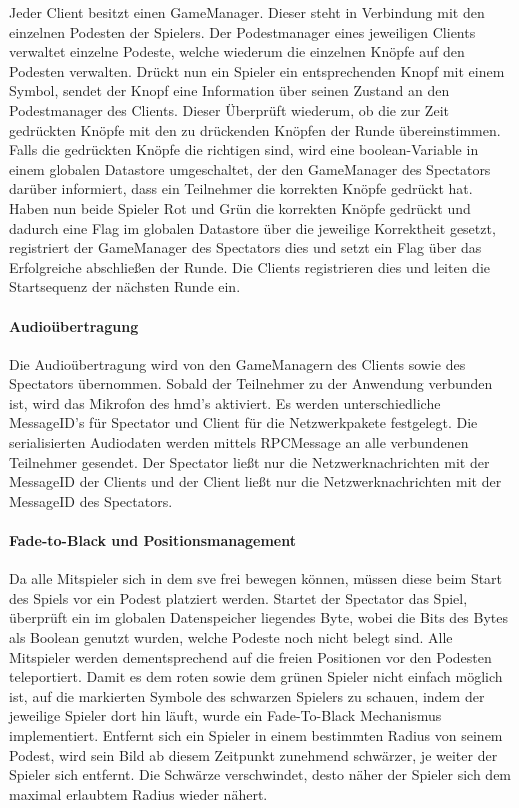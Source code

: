 \documentclass[a4paper,11pt]{article}%
\renewcommand{\\}{\vspace*{0.5\baselineskip} \newline}
\begin{document}
Jeder Client besitzt einen GameManager. Dieser steht in Verbindung mit den einzelnen Podesten der Spielers. Der Podestmanager eines jeweiligen Clients verwaltet einzelne Podeste, welche wiederum die einzelnen Knöpfe auf den Podesten verwalten. 
Drückt nun ein Spieler ein entsprechenden Knopf mit einem Symbol, sendet der Knopf eine Information über seinen Zustand an den Podestmanager des Clients. Dieser Überprüft wiederum, ob die zur Zeit gedrückten Knöpfe mit den zu drückenden Knöpfen der Runde übereinstimmen. Falls die gedrückten Knöpfe die richtigen sind, wird eine boolean-Variable in einem globalen Datastore umgeschaltet, der den GameManager des Spectators darüber informiert, dass ein Teilnehmer die korrekten Knöpfe gedrückt hat. Haben nun beide Spieler \dq{}Rot und Grün\dq{} die korrekten Knöpfe gedrückt und dadurch eine Flag im globalen Datastore über die jeweilige Korrektheit gesetzt, registriert der GameManager des Spectators dies und setzt ein Flag über das Erfolgreiche abschließen der Runde. Die Clients registrieren dies und leiten die Startsequenz der nächsten Runde ein. 

\paragraph{Audioübertragung}
Die Audioübertragung wird von den GameManagern des Clients sowie des Spectators übernommen. Sobald der Teilnehmer zu der Anwendung verbunden ist, wird das Mikrofon des \ac{hmd}'s aktiviert. Es werden unterschiedliche MessageID's für Spectator und Client für die Netzwerkpakete festgelegt. Die serialisierten Audiodaten werden mittels RPCMessage an alle verbundenen Teilnehmer gesendet. Der Spectator ließt nur die Netzwerknachrichten mit der MessageID der Clients und der Client ließt nur die Netzwerknachrichten mit der MessageID des Spectators.
\newpage
\paragraph{Fade-to-Black und Positionsmanagement}
	Da alle Mitspieler sich in dem \ac{sve} frei bewegen können, müssen diese beim Start des Spiels vor ein Podest platziert werden. Startet der Spectator das Spiel, überprüft ein im globalen Datenspeicher liegendes Byte, wobei die Bits des Bytes als Boolean genutzt wurden, welche Podeste noch nicht belegt sind. Alle Mitspieler werden dementsprechend auf die freien Positionen vor den Podesten teleportiert.
Damit es dem roten sowie dem grünen Spieler nicht einfach möglich ist, auf die markierten Symbole des schwarzen Spielers zu schauen, indem der jeweilige Spieler dort hin läuft, wurde ein Fade-To-Black Mechanismus implementiert. Entfernt sich ein Spieler in einem bestimmten Radius von seinem Podest, wird sein Bild ab diesem Zeitpunkt zunehmend schwärzer, je weiter der Spieler sich entfernt. Die Schwärze verschwindet, desto näher der Spieler sich dem maximal erlaubtem Radius wieder nähert.
\end{document}
